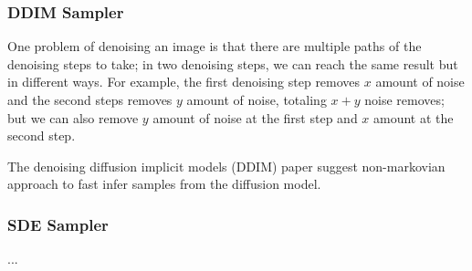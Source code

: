 \subsubsection{DDIM Sampler}

One problem of denoising an image is that there are multiple paths of the denoising steps to take; in two denoising steps, we can reach the same result but in different ways. For example, the first denoising step removes $x$ amount of noise and the second steps removes $y$ amount of noise, totaling $x+y$ noise removes; but we can also remove $y$ amount of noise at the first step and $x$ amount at the second step.

The denoising diffusion implicit models (DDIM) paper \cite{ddim} suggest non-markovian approach to fast infer samples from the diffusion model.







\subsubsection{SDE Sampler}

...